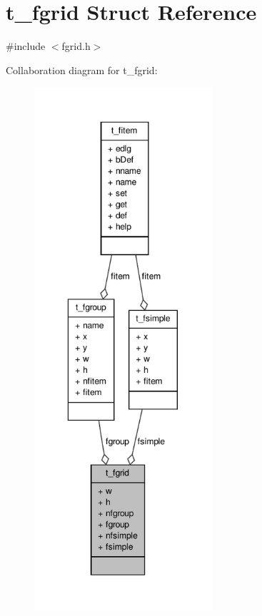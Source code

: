 \hypertarget{structt__fgrid}{\section{t\-\_\-fgrid \-Struct \-Reference}
\label{structt__fgrid}
}


{\ttfamily \#include $<$fgrid.\-h$>$}



\-Collaboration diagram for t\-\_\-fgrid\-:
\nopagebreak
\begin{figure}[H]
\begin{center}
\leavevmode
\includegraphics[height=550pt]{structt__fgrid__coll__graph}
\end{center}
\end{figure}
